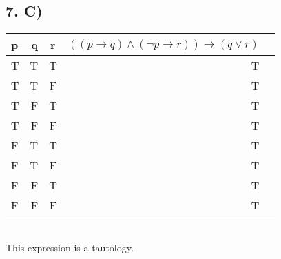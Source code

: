 \documentclass[12]{scrartcl}
\begin{document}
\subsection*{7. C)}
\begin{tabular}{ l | r | c || r || r ||}
p & q & r & $ ((p \rightarrow q) \wedge (\neg p \rightarrow r)) \rightarrow (q \vee r)$ \\
  \hline                        
  T & T & T & T\\
  T & T & F & T\\
  T & F & T & T\\
  T & F & F & T\\
  F & T & T & T\\
  F & T & F & T\\
  F & F & T & T\\
  F & F & F & T\\
  \hline  
\end{tabular} \\
This expression is a tautology. 
\end{document}

